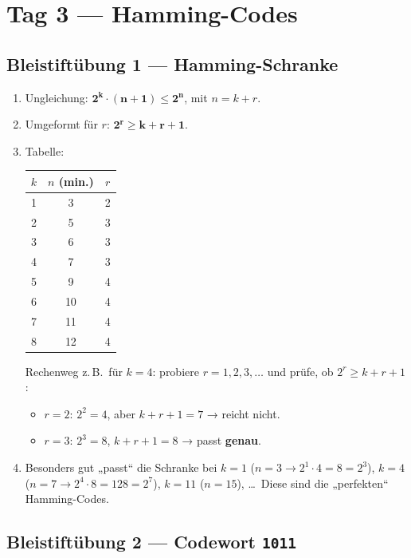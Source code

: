 \section{Tag 3 — Hamming-Codes}

\subsection*{Bleistiftübung 1 — Hamming-Schranke}

\begin{enumerate}[label=(\alph*), leftmargin=*]
\item Ungleichung: $\mathbf{2^k \cdot (n + 1) \le 2^n}$, mit $n = k + r$.
\item Umgeformt für $r$: $\mathbf{2^r \ge k + r + 1}$.
\item Tabelle:

  \begin{center}
  \begin{tabular}{ccc}
    \toprule
    $k$ & $n$ (min.) & $r$ \\
    \midrule
    1 & 3  & 2 \\
    2 & 5  & 3 \\
    3 & 6  & 3 \\
    4 & 7  & 3 \\
    5 & 9  & 4 \\
    6 & 10 & 4 \\
    7 & 11 & 4 \\
    8 & 12 & 4 \\
    \bottomrule
  \end{tabular}
  \end{center}

  Rechenweg z.\,B.\ für $k = 4$: probiere $r = 1, 2, 3, \dots$ und
  prüfe, ob $2^r \ge k + r + 1$:
  \begin{itemize}
  \item $r = 2$: $2^2 = 4$, aber $k + r + 1 = 7$ → reicht nicht.
  \item $r = 3$: $2^3 = 8$, $k + r + 1 = 8$ → passt \textbf{genau}.
  \end{itemize}

\item Besonders gut „passt“ die Schranke bei $k = 1$
  ($n = 3 \to 2^1 \cdot 4 = 8 = 2^3$), $k = 4$
  ($n = 7 \to 2^4 \cdot 8 = 128 = 2^7$), $k = 11$ ($n = 15$), \dots\
  Diese sind die „perfekten“ Hamming-Codes.
\end{enumerate}

\subsection*{Bleistiftübung 2 — Codewort \texttt{1011}}

